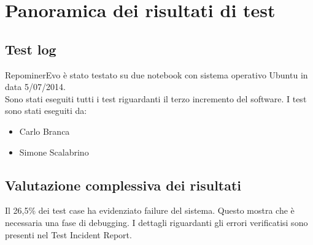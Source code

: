 \chapter{Panoramica dei risultati di test}

\section{Test log}

RepominerEvo è stato testato su due notebook con sistema operativo Ubuntu in data 5/07/2014.\\
Sono stati eseguiti tutti i test riguardanti il terzo incremento del software.
I test sono stati eseguiti da:
\begin{itemize}
\item Carlo Branca
\item Simone Scalabrino
\end{itemize}

\section{Valutazione complessiva dei risultati}

Il 26,5\% dei test case ha evidenziato failure del sistema. Questo mostra che è necessaria una fase di debugging. I dettagli riguardanti gli errori verificatisi sono presenti nel Test Incident Report.\\

\clearpage